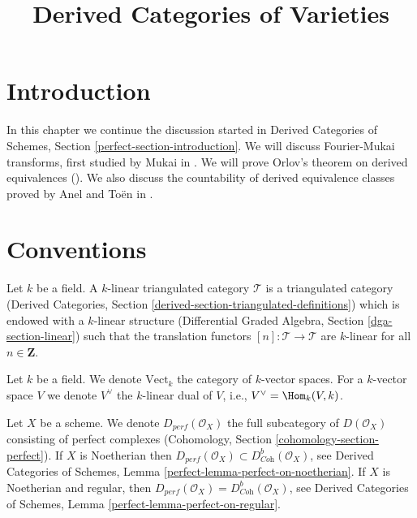 

%


\title{Derived Categories of Varieties}


\maketitle

\label{section-phantom}

\tableofcontents

\section{Introduction}
\label{section-introduction}

\noindent
In this chapter we continue the discussion started in
Derived Categories of Schemes, Section \ref{perfect-section-introduction}.
We will discuss Fourier-Mukai transforms,
first studied by Mukai in \cite{Mukai}.
We will prove Orlov's theorem on derived equivalences (\cite{Orlov-K3}).
We also discuss the countability of derived equivalence
classes proved by Anel and To\"en in \cite{AT}.




\section{Conventions}
\label{section-conventions}

\noindent
Let $k$ be a field. A $k$-linear triangulated category $\mathcal{T}$
is a triangulated category (Derived Categories, Section
\ref{derived-section-triangulated-definitions})
which is endowed with a $k$-linear structure
(Differential Graded Algebra, Section \ref{dga-section-linear})
such that the translation functors $[n] : \mathcal{T} \to \mathcal{T}$
are $k$-linear for all $n \in \mathbf{Z}$.

\medskip\noindent
Let $k$ be a field. We denote $\text{Vect}_k$ the category of
$k$-vector spaces. For a $k$-vector space $V$ we denote
$V^\vee$ the $k$-linear dual of $V$, i.e., $V^\vee = \Hom_k(V, k)$.

\medskip\noindent
Let $X$ be a scheme. We denote $D_{perf}(\mathcal{O}_X)$ the full
subcategory of $D(\mathcal{O}_X)$ consisting of perfect complexes
(Cohomology, Section \ref{cohomology-section-perfect}).
If $X$ is Noetherian then
$D_{perf}(\mathcal{O}_X) \subset D^b_{\textit{Coh}}(\mathcal{O}_X)$, see
Derived Categories of Schemes, Lemma \ref{perfect-lemma-perfect-on-noetherian}.
If $X$ is Noetherian and regular, then
$D_{perf}(\mathcal{O}_X) = D^b_{\textit{Coh}}(\mathcal{O}_X)$, see
Derived Categories of Schemes, Lemma \ref{perfect-lemma-perfect-on-regular}.

